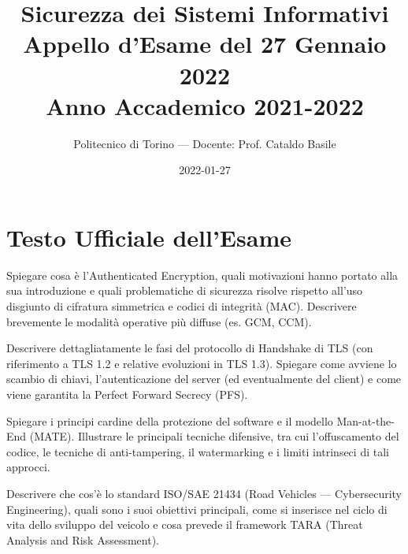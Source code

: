 \documentclass[11pt,a4paper]{article}
\begin{document}
\title{\textbf{Sicurezza dei Sistemi Informativi} \\ \large Appello d'Esame del 27 Gennaio 2022 \\ \small Anno Accademico 2021-2022}
\author{Politecnico di Torino --- Docente: Prof. Cataldo Basile}
\date{2022-01-27}
\maketitle


\section{Testo Ufficiale dell'Esame}

\begin{questionbox}
Spiegare cosa \`e l'Authenticated Encryption, quali motivazioni hanno portato alla sua introduzione e quali problematiche di sicurezza risolve rispetto all'uso disgiunto di cifratura simmetrica e codici di integrit\`a (MAC). Descrivere brevemente le modalit\`a operative pi\`u diffuse (es. GCM, CCM).
\end{questionbox}

\begin{questionbox}
Descrivere dettagliatamente le fasi del protocollo di Handshake di TLS (con riferimento a TLS 1.2 e relative evoluzioni in TLS 1.3). Spiegare come avviene lo scambio di chiavi, l'autenticazione del server (ed eventualmente del client) e come viene garantita la Perfect Forward Secrecy (PFS).
\end{questionbox}

\begin{questionbox}
Spiegare i principi cardine della protezione del software e il modello Man-at-the-End (MATE). Illustrare le principali tecniche difensive, tra cui l'offuscamento del codice, le tecniche di anti-tampering, il watermarking e i limiti intrinseci di tali approcci.
\end{questionbox}

\begin{questionbox}
Descrivere che cos'\`e lo standard ISO/SAE 21434 (Road Vehicles --- Cybersecurity Engineering), quali sono i suoi obiettivi principali, come si inserisce nel ciclo di vita dello sviluppo del veicolo e cosa prevede il framework TARA (Threat Analysis and Risk Assessment).
\end{questionbox}
\end{document}
